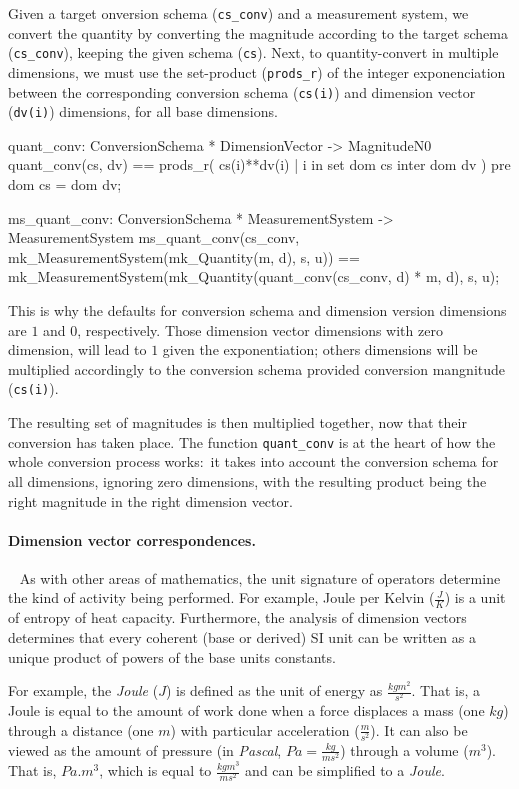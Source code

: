 \documentclass[runningheads,a4paper]{llncs}
\begin{document}
Given a target onversion schema (\texttt{cs\_conv}) and a measurement system, we convert the quantity by converting the magnitude according to the target schema (\texttt{cs\_conv}), keeping the given schema (\texttt{cs}). Next, to quantity-convert in multiple dimensions, we must use the set-product (\texttt{prods\_r}) of the integer exponenciation between the corresponding conversion schema (\texttt{cs(i)}) and dimension vector (\texttt{dv(i)}) dimensions, for all base dimensions. 
%
\begin{vdmsl}[frame=none,basicstyle=\ttfamily\scriptsize]
    quant_conv: ConversionSchema * DimensionVector -> MagnitudeN0
    quant_conv(cs, dv) ==
        prods_r({ cs(i)**dv(i) | i in set dom cs inter dom dv })
    pre
        dom cs = dom dv;

    ms_quant_conv: ConversionSchema * MeasurementSystem -> MeasurementSystem
    ms_quant_conv(cs_conv, mk_MeasurementSystem(mk_Quantity(m, d), s, u)) ==
        mk_MeasurementSystem(mk_Quantity(quant_conv(cs_conv, d) * m, d), s, u);
\end{vdmsl}
%
\noindent This is why the defaults for conversion schema and dimension version dimensions are \(1\) and \(0\), respectively. Those dimension vector dimensions with zero dimension, will lead to \(1\) given the exponentiation; others dimensions will be multiplied accordingly to the conversion schema provided conversion mangnitude (\texttt{cs(i)}).

The resulting set of magnitudes is then multiplied together, now that their conversion has taken place. The function \texttt{quant\_conv} is at the heart of how the whole conversion process works:~it takes into account the conversion schema for all dimensions, ignoring zero dimensions, with the resulting product being the right magnitude in the right dimension vector.   

\paragraph*{Dimension vector correspondences.}~
%
As with other areas of mathematics, the unit signature of operators determine the kind of activity being performed. For example, Joule per Kelvin (\(\frac{J}{K}\)) is a unit of entropy of heat capacity. Furthermore, the analysis of dimension vectors determines that every coherent (base or derived) SI unit can be written as a unique product of powers of the base units constants. 

For example, the \textit{Joule} (\(J\)) is defined as the unit of energy as \(\frac{kgm^2}{s^2}\). That is, a Joule is equal to the amount of work done when a force displaces a mass (one \(kg\)) through a distance (one \(m\)) with particular acceleration (\(\frac{m}{s^2}\)). It can also be viewed as the amount of pressure (in \textit{Pascal}, \(Pa = \frac{kg}{ms^2}\)) through a volume (\(m^3\)). That is, \(Pa . m^3\), which is equal to \(\frac{kgm^3}{ms^2}\) and can be simplified to a \textit{Joule}. 
\end{document}
